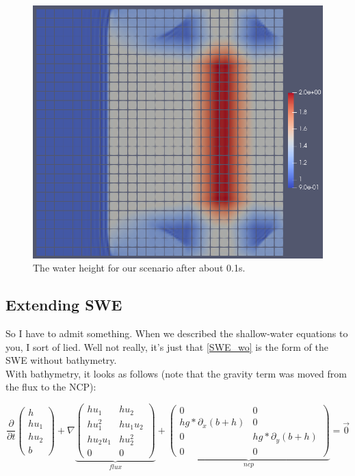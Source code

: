 \documentclass[12pt,letterpaper]{article}
\begin{document}
\begin{figure}[!h]
\centering
\includegraphics[width=0.70\linewidth]{SWE_wo.png}
\caption{The water height for our scenario after about 0.1s.}
\end{figure}

\newpage

\subsection{Extending SWE}

\vspace{0.2cm}

So I have to admit something. When we described the shallow-water equations to you, I sort of lied.
Well not really, it's just that \ref{SWE_wo} is the form of the SWE without bathymetry.\\
With bathymetry, it looks as follows (note that the gravity term was moved from the flux to the NCP):

\begin{equation*} \label{SWE_w}
    \frac{\partial}{\partial t}\left(
    \begin{array}{lr} h \\
        h u_1 \\
        h u_2 \\
        b 
        \end{array} \right) +
    \nabla \underbrace{\begin{pmatrix}
        h u_1           & h u_2     \\
        h u_1^2         & h u_1 u_2 \\
        h u_2 u_1       & h u_2^2   \\
        0               & 0
    \end{pmatrix}}_{ flux } +
    \underbrace{\begin{pmatrix}
        0                     & 0\\
        h g*\partial_x(b+h)   & 0\\
        0                     & h g*\partial_y(b+h) \\
        0                     & 0
    \end{pmatrix}}_{ ncp }  = \vec{0}
\end{equation*}
\end{document}
